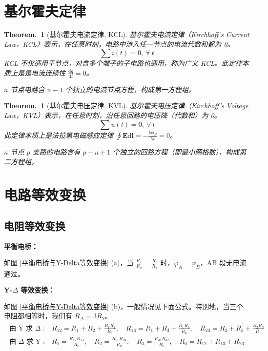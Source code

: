 \documentclass[UTF8]{report}
\def\p{\partial}
\theoremstyle{MyLineTheoremStyle} %
\theoremstyle{MyBlockTheoremStyle} %
\newtheorem{BlockTheorem}[LineTheorem]{Theorem.\,} %
\theoremstyle{MySubsubsectionStyle} %
\begin{document}
\section{基尔霍夫定律}


\begin{BlockTheorem}[基尔霍夫电流定律, KCL]
基尔霍夫电流定律（Kirchhoff's Current Law，KCL）表示，在任意时刻，电路中流入任一节点的电流代数和都为 0。
\begin{equation}
\sum i(t) = 0,\ \forall\ t 
\end{equation}
KCL 不仅适用于节点，对含多个端子的子电路也适用，称为广义 KCL。此定律本质上是是电流连续性 $\frac{\mathrm{d}q}{\mathrm{d}t} = 0$。

$n$ 节点电路含 $n-1$ 个独立的电流节点方程，构成第一方程组。
\end{BlockTheorem}

\begin{BlockTheorem}[基尔霍夫电压定律, KVL]
基尔霍夫电压定律（Kirchhoff's Voltage Law，KVL）表示，在任意时刻，沿任意回路的电压降（代数和）为 0。
\begin{equation}
\sum u(t) = 0,\ \forall\ t
\end{equation}
此定律本质上是法拉第电磁感应定律 $\oint \boldsymbol{E} \mathrm{d}\boldsymbol{l} = -\frac{\p \phi_B}{\p t} = 0$。

$n$ 节点 $p$ 支路的电路含有 $p-n+1$ 个独立的回路方程（即最小网格数），构成第二方程组。
\end{BlockTheorem}


\section{电路等效变换}

\subsection{电阻等效变换}

\noindent\textbf{平衡电桥：}

如图 \ref{平衡电桥与Y-Delta等效变换} (a)，当 $\frac{R_1}{R_2} = \frac{R_3}{R_4}$ 时，$\varphi_A = \varphi_B$，AB 段无电流通过。 

\noindent\textbf{Y-$\Delta$ 等效变换：}

如图 \ref{平衡电桥与Y-Delta等效变换} (b)，一般情况见下面公式。特别地，当三个电阻都相等时，我们有 $R_{\Delta} = 3R_Y$。
\begin{gather}
\boxed{
\begin{matrix}
    \text{由 Y 求 $\Delta$ :}\quad R_{12}= R_1 + R_2 + \frac{R_1R_2}{R_3}, \quad
    R_{13}=R_1 + R_3 + \frac{R_1R_3}{R_2} , \quad
    R_{23}=R_2 + R_3 + \frac{R_2R_3}{R_1} \\ 
    \text{由 $\Delta$ 求 Y :}\quad R_{1}=\frac{R_{12}R_{13}}{R_0}, \quad
    R_{2}=\frac{R_{21}R_{23}}{R_0}, \quad
    R_{3}=\frac{R_{31}R_{32}}{R_0},\quad 
    R_0 = R_{12}+R_{13}+R_{23} 
\end{matrix}
}
\end{gather}
\end{document}
